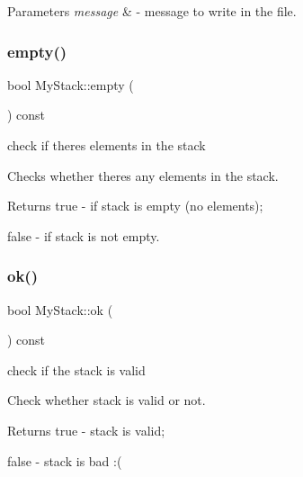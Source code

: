 \begin{DoxyParams}{Parameters}
{\em message} & -\/ message to write in the file. \\
\hline
\end{DoxyParams}
\mbox{\label{class_my_stack_a63f6a62fd6fa804501d564946512464b}} 
\subsubsection{\texorpdfstring{empty()}{empty()}}
{\footnotesize\ttfamily bool My\+Stack\+::empty (\begin{DoxyParamCaption}{ }\end{DoxyParamCaption}) const}



check if there\textquotesingle{}s elements in the stack 

Checks whether there\textquotesingle{}s any elements in the stack.

\begin{DoxyReturn}{Returns}
{\ttfamily true} -\/ if stack is empty (no elements); 

{\ttfamily false} -\/ if stack is not empty. 
\end{DoxyReturn}
\mbox{\label{class_my_stack_adcf03c60e2cc3c0fdc4384c6fc469066}} 
\subsubsection{\texorpdfstring{ok()}{ok()}}
{\footnotesize\ttfamily bool My\+Stack\+::ok (\begin{DoxyParamCaption}{ }\end{DoxyParamCaption}) const\hspace{0.3cm}{\ttfamily [private]}}



check if the stack is valid 

Check whether stack is valid or not.

\begin{DoxyReturn}{Returns}
{\ttfamily true} -\/ stack is valid; 

{\ttfamily false} -\/ stack is bad \+:( 
\end{DoxyReturn}
\mbox{\label{class_my_stack_a9f919749f79ab445c6437cac3830e7bb}} 
